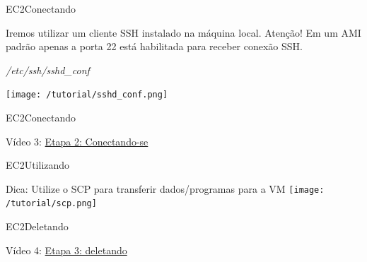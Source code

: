 \documentclass[xcolor=table]{beamer}
\begin{document}
\begin{frame}[c]{EC2}{Conectando}
        \begin{center}
            \begin{outline}                
                \1 Iremos utilizar um cliente SSH instalado na máquina local.
                \1 Atenção! Em um AMI padrão apenas a porta 22 está habilitada para receber conexão SSH.
            \end{outline}
        \end{center}
        \begin{center}
        
            \textit{/etc/ssh/sshd\_conf}
            
            \texttt{[image: /tutorial/sshd\_conf.png]}
        \end{center}

\end{frame}


\begin{frame}[c]{EC2}{Conectando}

        \begin{center}
            Vídeo 3: \href{run:./3_connecting.ogv}{Etapa 2: Conectando-se}
        \end{center}
      
\end{frame}



\begin{frame}[c]{EC2}{Utilizando}


        \begin{center}
            

            \begin{outline}
            \1[] Dica:
            \2[] Utilize o SCP para transferir dados/programas para a VM 
            \2[] \texttt{[image: /tutorial/scp.png]}
            
            \end{outline}
        \end{center}      
\end{frame}


\begin{frame}[c]{EC2}{Deletando}

        \begin{center}
            Vídeo 4: \href{run:./4_encerrando.ogv}{Etapa 3: deletando}
        \end{center}
      
\end{frame}
\end{document}

